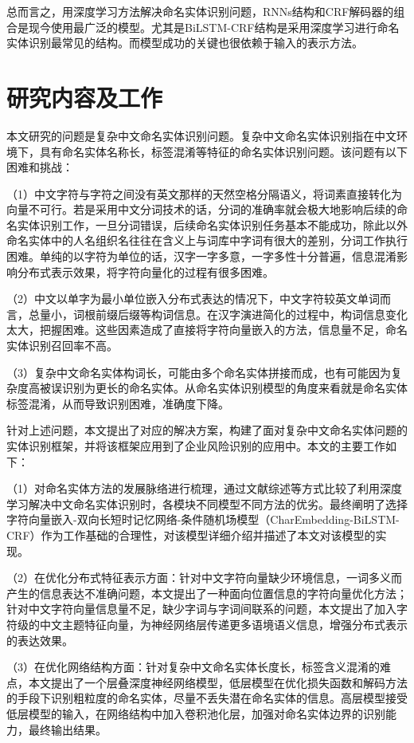 \documentclass[winfonts,master,oneside,nobackinfo]{njuthesis}
\begin{document}
总而言之，用深度学习方法解决命名实体识别问题，RNNs结构和CRF解码器的组合是现今使用最广泛的模型。尤其是BiLSTM-CRF结构是采用深度学习进行命名实体识别最常见的结构。而模型成功的关键也很依赖于输入的表示方法。

\section{研究内容及工作}
本文研究的问题是复杂中文命名实体识别问题。复杂中文命名实体识别指在中文环境下，具有命名实体名称长，标签混淆等特征的命名实体识别问题。该问题有以下困难和挑战：

（1）中文字符与字符之间没有英文那样的天然空格分隔语义，将词素直接转化为向量不可行。若是采用中文分词技术的话，分词的准确率就会极大地影响后续的命名实体识别工作，一旦分词错误，后续命名实体识别任务基本不能成功，除此以外命名实体中的人名组织名往往在含义上与词库中字词有很大的差别，分词工作执行困难。单纯的以字符为单位的话，汉字一字多意，一字多性十分普遍，信息混淆影响分布式表示效果，将字符向量化的过程有很多困难。

（2）中文以单字为最小单位嵌入分布式表达的情况下，中文字符较英文单词而言，总量小，词根前缀后缀等构词信息。在汉字演进简化的过程中，构词信息变化太大，把握困难。这些因素造成了直接将字符向量嵌入的方法，信息量不足，命名实体识别召回率不高。

（3）复杂中文命名实体构词长，可能由多个命名实体拼接而成，也有可能因为复杂度高被误识别为更长的命名实体。从命名实体识别模型的角度来看就是命名实体标签混淆，从而导致识别困难，准确度下降。

针对上述问题，本文提出了对应的解决方案，构建了面对复杂中文命名实体问题的实体识别框架，并将该框架应用到了企业风险识别的应用中。本文的主要工作如下：

（1）对命名实体方法的发展脉络进行梳理，通过文献综述等方式比较了利用深度学习解决中文命名实体识别时，各模块不同模型不同方法的优劣。最终阐明了选择字符向量嵌入-双向长短时记忆网络-条件随机场模型（CharEmbedding-BiLSTM-CRF）作为工作基础的合理性，对该模型详细介绍并描述了本文对该模型的实现。

（2）在优化分布式特征表示方面：针对中文字符向量缺少环境信息，一词多义而产生的信息表达不准确问题，本文提出了一种面向位置信息的字符向量优化方法；针对中文字符向量信息量不足，缺少字词与字词间联系的问题，本文提出了加入字符级的中文主题特征向量，为神经网络层传递更多语境语义信息，增强分布式表示的表达效果。

（3）在优化网络结构方面：针对复杂中文命名实体长度长，标签含义混淆的难点，本文提出了一个层叠深度神经网络模型，低层模型在优化损失函数和解码方法的手段下识别粗粒度的命名实体，尽量不丢失潜在命名实体的信息。高层模型接受低层模型的输入，在网络结构中加入卷积池化层，加强对命名实体边界的识别能力，最终输出结果。
\end{document}
